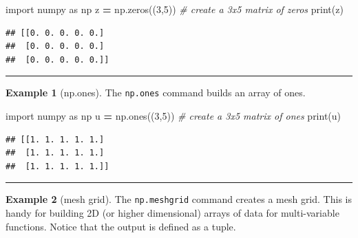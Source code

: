 \documentclass[
]{book}
\newenvironment{Shaded}{\begin{snugshade}}{\end{snugshade}}
\newcommand{\BuiltInTok}[1]{#1}
\newcommand{\CommentTok}[1]{\textcolor[rgb]{0.56,0.35,0.01}{\textit{#1}}}
\newcommand{\DecValTok}[1]{\textcolor[rgb]{0.00,0.00,0.81}{#1}}
\newcommand{\ImportTok}[1]{#1}
\newcommand{\NormalTok}[1]{#1}
\newcommand{\OperatorTok}[1]{\textcolor[rgb]{0.81,0.36,0.00}{\textbf{#1}}}
\theoremstyle{definition}
\theoremstyle{definition}
\newtheorem{example}{Example}[chapter]
\theoremstyle{definition}
\theoremstyle{remark}
\begin{document}
\begin{Shaded}
\begin{Highlighting}[]
\ImportTok{import}\NormalTok{ numpy }\ImportTok{as}\NormalTok{ np}
\NormalTok{z }\OperatorTok{=}\NormalTok{ np.zeros((}\DecValTok{3}\NormalTok{,}\DecValTok{5}\NormalTok{)) }\CommentTok{\# create a 3x5 matrix of zeros}
\BuiltInTok{print}\NormalTok{(z)}
\end{Highlighting}
\end{Shaded}

\begin{verbatim}
## [[0. 0. 0. 0. 0.]
##  [0. 0. 0. 0. 0.]
##  [0. 0. 0. 0. 0.]]
\end{verbatim}

\begin{center}\rule{0.5\linewidth}{0.5pt}\end{center}

\begin{example}[np.ones]
\protect\hypertarget{exm:unnamed-chunk-744}{}{\label{exm:unnamed-chunk-744} {} }The \texttt{np.ones} command builds an array of ones.
\end{example}

\begin{Shaded}
\begin{Highlighting}[]
\ImportTok{import}\NormalTok{ numpy }\ImportTok{as}\NormalTok{ np}
\NormalTok{u }\OperatorTok{=}\NormalTok{ np.ones((}\DecValTok{3}\NormalTok{,}\DecValTok{5}\NormalTok{)) }\CommentTok{\# create a 3x5 matrix of ones}
\BuiltInTok{print}\NormalTok{(u)}
\end{Highlighting}
\end{Shaded}

\begin{verbatim}
## [[1. 1. 1. 1. 1.]
##  [1. 1. 1. 1. 1.]
##  [1. 1. 1. 1. 1.]]
\end{verbatim}

\begin{center}\rule{0.5\linewidth}{0.5pt}\end{center}

\begin{example}[mesh grid]
\protect\hypertarget{exm:unnamed-chunk-746}{}{\label{exm:unnamed-chunk-746} {} }The \texttt{np.meshgrid} command creates a mesh grid. This is handy for building 2D (or higher dimensional) arrays of data for multi-variable functions. Notice that the output is defined as a tuple.
\end{example}
\end{document}
